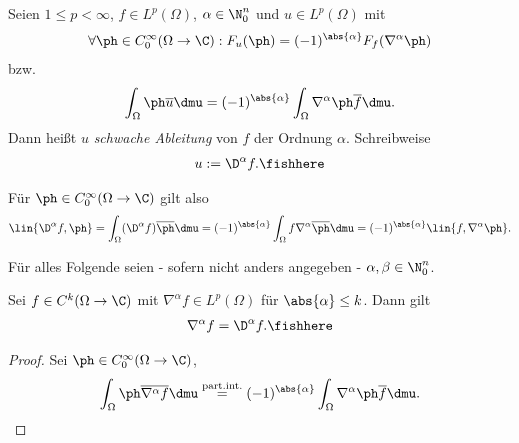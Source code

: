 \begin{defn}
\label{defn:7.25}
Seien $1\le p < \infty$, $f\in L^p(\Omega)$, $\alpha\in \N_0^n$ und $u\in
L^p(\Omega)$ mit
\begin{align*}
\forall \ph \in C_0^\infty(\Omega\to \C) : F_u(\ph) =
(-1)^{\abs{\alpha}}F_f(\nabla^\alpha \ph) 
\end{align*}
bzw.
\begin{align*}
\int_\Omega \ph\overline{u}\dmu =
(-1)^{\abs{\alpha}}\int_\Omega \nabla^\alpha \ph \overline{f}\dmu.
\end{align*}
Dann heißt $u$ \emph{schwache Ableitung} von $f$ der
Ordnung $\alpha$. Schreibweise
\begin{align*}
u:= \D^\alpha f.\fishhere
\end{align*}
\end{defn}
Für $\ph\in C_0^\infty(\Omega\to\C)$ gilt also
\begin{align*}
\lin{\D^\alpha f,\ph} = 
\int_\Omega (\D^\alpha f)\overline{\ph} \dmu = 
(-1)^{\abs{\alpha}}\int_\Omega f \nabla^\alpha \overline{\ph}\dmu = 
(-1)^{\abs{\alpha}}\lin{f, \nabla^\alpha\ph}.
\end{align*}

Für alles Folgende seien - sofern nicht anders angegeben -
$\alpha,\beta\in\N_0^n$.

\begin{cor}
\label{prop:7.26}
Sei $f\in C^k(\Omega\to\C)$ mit $\nabla^\alpha f \in L^p(\Omega)$ für
$\abs{\alpha}\le k$. Dann gilt
\begin{align*}
\nabla^\alpha f = \D^\alpha f.\fishhere
\end{align*}
\end{cor}
\begin{proof}
Sei $\ph\in C_0^\infty(\Omega\to\C)$,
\begin{align*}
\int_\Omega \ph \overline{\nabla^\alpha f}\dmu
\overset{\text{part.int.}}{=}
 (-1)^{\abs{\alpha}}\int_\Omega \nabla^\alpha \ph \overline{f}\dmu.\qedhere
\end{align*}
\end{proof}


